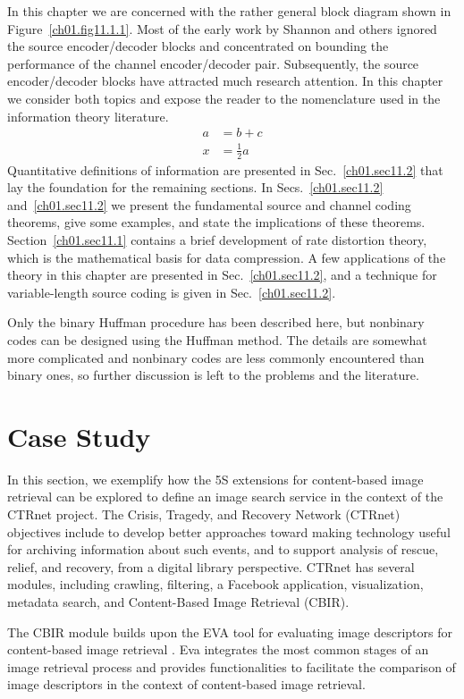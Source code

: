 In this chapter we are concerned with the rather general block diagram
shown in Figure~\ref{ch01.fig11.1.1}. Most of the early work by
Shannon and others ignored the source  encoder/decoder blocks and
concentrated  on bounding the performance of the channel
encoder/decoder pair. Subsequently, the source  encoder/decoder blocks
have attracted much research attention.  In this chapter we consider
both topics and expose the reader to the nomenclature used in the
information theory literature.
\begin{align}
a& = b + c\\
x&= \frac{1}{2} a
\end{align}
Quantitative definitions of information are presented in
Sec.~\ref{ch01.sec11.2} that lay the foundation for the remaining
sections. In Secs.~\ref{ch01.sec11.2} and~\ref{ch01.sec11.2} we present
the fundamental source and channel coding theorems, give some examples,
and state the implications of these theorems.
Section~\ref{ch01.sec11.1} contains a brief development of rate
distortion theory,
which is the mathematical basis for data compression.
A few applications of the theory in this chapter are presented
in Sec.~\ref{ch01.sec11.2}, and a technique for variable-length
source coding is given in Sec.~\ref{ch01.sec11.2}.

Only the binary Huffman procedure has been described here,
but nonbinary codes can be designed using the Huffman method.
The details are somewhat more complicated and nonbinary codes
are less commonly encountered than binary ones,
so further discussion is left to the problems and the literature.

\section{Case Study}
\label{sec:case-study}

In this section, we exemplify how the 5S extensions for content-based image retrieval can be explored to define an image search service in the context of the CTRnet project.
The Crisis, Tragedy, and Recovery Network (CTRnet)~\cite{Balzer2007} objectives include to develop better
approaches toward making technology useful for archiving information about such events, and to support
analysis of rescue, relief, and recovery, from a digital library  perspective. CTRnet has
several modules, including crawling, filtering, a Facebook application, visualization, metadata
search, and Content-Based Image Retrieval (CBIR). 

The CBIR module
builds upon the EVA tool for evaluating image descriptors for content-based image retrieval \cite{Bierman2005}. Eva integrates the most common stages of an image retrieval process and provides functionalities to facilitate the comparison of image descriptors in the context of content-based image retrieval.

